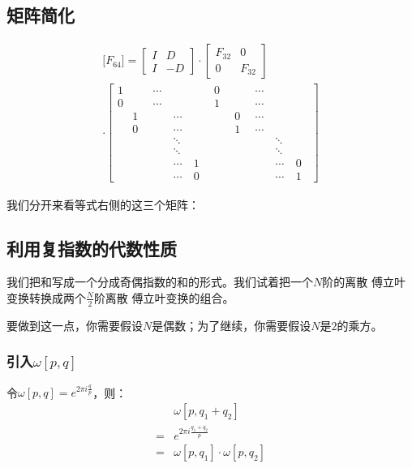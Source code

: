 \subsection{矩阵简化}
\begin{align*}
	\Bigg[F_{64}\Bigg]=\begin{bmatrix}
		I & D \\I&-D
	\end{bmatrix}
	\cdot
	\begin{bmatrix}F_{32}&0\\0&F_{32}\end{bmatrix} \\
	\cdot
	\begin{bmatrix}
		1 & \quad & \cdots & \quad  & \quad & 0     & \quad & \cdots & \quad  & \quad \\
		0 & \quad & \cdots & \quad  & \quad & 1     & \quad & \cdots & \quad  & \quad \\
		  & 1     & \quad  & \cdots & \quad & \quad & 0     & \cdots & \quad  & \quad \\
		  & 0     & \quad  & \cdots & \quad & \quad & 1     & \cdots & \quad  & \quad \\
		  & \quad & \quad  & \ddots & \quad & \quad & \quad & \quad  & \ddots & \quad \\
		  & \quad & \quad  & \ddots & \quad & \quad & \quad & \quad  & \ddots & \quad \\
		  & \quad & \quad  & \cdots & 1     & \quad & \quad & \quad  & \cdots & 0     \\
		  & \quad & \quad  & \cdots & 0     & \quad & \quad & \quad  & \cdots & 1
	\end{bmatrix}
\end{align*}

我们分开来看等式右侧的这三个矩阵：

\subsection{利用复指数的代数性质}
我们把和写成一个分成奇偶指数的和的形式。我们试着把一个$N$阶的离散 傅立叶变换转换成两个$\frac{N}{2}$阶离散 傅立叶变换的组合。

要做到这一点，你需要假设$N$是偶数；为了继续，你需要假设$N$是$2$的乘方。
\subsubsection{引入$\omega[p,q]$}
令$\omega[p,q] = e^{2\pi i\frac{q}{p}}$，则：
\begin{align*}
	  & \omega[p,q_1+q_2]                \\
	= & e^{2\pi i\frac{q_1+q_2}{p}}      \\
	= & \omega[p,q_1]\cdot \omega[p,q_2]
\end{align*}

